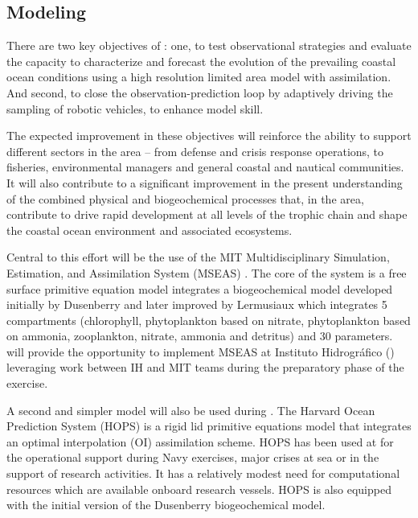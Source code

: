 
\subsection{Modeling}

There are two key objectives of \proje: one, to test observational
strategies and evaluate the capacity to characterize and forecast the
evolution of the prevailing coastal ocean conditions using a high
resolution limited area model with assimilation. And second, to close
the observation-prediction loop by adaptively driving the sampling of
robotic vehicles, to enhance model skill.

The expected improvement in these objectives will reinforce the
ability to support different sectors in the area -- from defense and
crisis response operations, to fisheries, environmental managers and
general coastal and nautical communities. It will also contribute to a
significant improvement in the present understanding of the combined
physical and biogeochemical processes that, in the \naz area,
contribute to drive rapid development at all levels of the trophic
chain and shape the coastal ocean environment and associated
ecosystems.

Central to this effort will be the use of the MIT Multidisciplinary
Simulation, Estimation, and Assimilation System (MSEAS)
\cite{haley10}. The core of the system is a free surface primitive
equation model  integrates a
biogeochemical model developed initially by Dusenberry and later
improved by Lermusiaux \cite{becsiktepe03} which integrates 5
compartments (chlorophyll, phytoplankton based on nitrate,
phytoplankton based on ammonia, zooplankton, nitrate, ammonia and
detritus) and 30 parameters. \proj will provide the opportunity to
implement MSEAS at Instituto Hidrogr\'{a}fico (\inste) leveraging work
between IH and MIT teams during the preparatory phase of the exercise.

A second and simpler model will also be used during \proje.  The
Harvard Ocean Prediction System (HOPS) \cite{robinson96} is a rigid
lid primitive equations model that integrates an optimal interpolation
(OI) assimilation scheme. HOPS has been used at \inst for the
operational support during Navy exercises, major crises at sea or in
the support of research activities. It has a relatively modest need
for computational resources which are available onboard research
vessels. HOPS is also equipped with the initial version of the
Dusenberry biogeochemical model.

